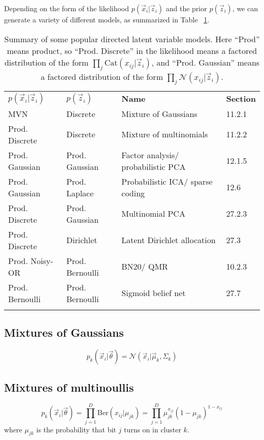 Depending on the form of the likelihood $p(\vec{x}_i|\vec{z}_i)$ and the prior $p(\vec{z}_i)$, we can generate a variety of different models, as summarized in Table ~\ref{tab:popular-directed-latent-variable-models}.

\begin{longtable}{llll}
\hline\noalign{\smallskip}
$p(\vec{x}_i|\vec{z}_i)$ & $p(\vec{z}_i)$ & \textbf{Name} & \textbf{Section} \\
\noalign{\smallskip}\hline\noalign{\smallskip}
MVN & Discrete & Mixture of Gaussians & 11.2.1 \\
Prod. Discrete & Discrete & Mixture of multinomials & 11.2.2 \\
Prod. Gaussian & Prod. Gaussian & Factor analysis/ probabilistic PCA & 12.1.5 \\
Prod. Gaussian & Prod. Laplace & Probabilistic ICA/ sparse coding & 12.6 \\
Prod. Discrete & Prod. Gaussian & Multinomial PCA & 27.2.3 \\
Prod. Discrete & Dirichlet & Latent Dirichlet allocation & 27.3 \\
Prod. Noisy-OR & Prod. Bernoulli & BN20/ QMR & 10.2.3 \\
Prod. Bernoulli & Prod. Bernoulli & Sigmoid belief net & 27.7 \\
\noalign{\smallskip}\hline\noalign{\smallskip}
\caption{Summary of some popular directed latent variable models. Here “Prod” means product, so “Prod. Discrete” in the likelihood means a factored distribution of the form $\prod_j \mathrm{Cat}(x_{ij}|\vec{z}_i)$, and “Prod. Gaussian” means a factored distribution of the form $\prod_j \mathcal{N}(x_{ij}|\vec{z}_i)$.}\label{tab:popular-directed-latent-variable-models} \\
\end{longtable}


\subsection{Mixtures of Gaussians}
\begin{equation}
p_k(\vec{x}_i|\vec{\theta})=\mathcal{N}(\vec{x}_i|\vec{\mu}_k,\Sigma_k)
\end{equation}


\subsection{Mixtures of multinoullis}
\begin{equation}
p_k(\vec{x}_i|\vec{\theta})=\prod\limits_{j=1}^D \mathrm{Ber}(x_{ij}|\mu_{jk})=\prod\limits_{j=1}^D \mu_{jk}^{x_{ij}}(1-\mu_{jk})^{1-x_{ij}}
\end{equation}
where $\mu_{jk}$ is the probability that bit $j$ turns on in cluster $k$.

